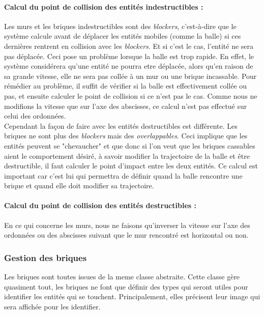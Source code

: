 \documentclass[a4paper,10pt]{article}
\begin{document}
		\paragraph{Calcul du point de collision des entités indestructibles : }
            Les murs et les briques indestructibles sont des \textit{blockers}, c'est-à-dire que le système calcule avant de
            déplacer les entités mobiles (comme la balle) si ces dernières rentrent en collision avec les \textit{blockers}.
            Et si c'est le cas, l'entité ne sera pas déplacée. Ceci pose un problème lorsque la balle est trop rapide. En
            effet, le système considérera qu'une entité ne pourra etre déplacée, alors qu'en raison de sa grande vitesse,
            elle ne sera pas collée à un mur ou une brique incassable. Pour rémédier au problème, il suffit de vérifier si
            la balle est effectivement collée ou pas, et ensuite calculer le point de collision si ce n'est pas le cas.
            Comme nous ne modifions la vitesse que sur l'axe des abscisses, ce calcul n'est pas effectué sur celui des
            ordonnées.\\

		Cependant la façon de faire avec les entités destructibles est différente. Les briques ne sont plus des \textit{blockers}
		mais des \textit{overlappables}. Ceci implique que les entités peuvent se "chevaucher" et que donc si l'on veut que les
		briques cassables aient le comportement désiré, à savoir modifier la trajectoire de la balle et être destructible, il faut
		calculer le point d'impact entre les deux entités. Ce calcul est important car c'est lui qui permettra de définir
		quand la balle rencontre une brique et quand elle doit modifier sa trajectoire.
		
		\paragraph{Calcul du point de collision des entités destructibles : }

        En ce qui concerne les murs, nous ne faisons qu'inverser la vitesse sur l'axe des ordonnées ou des abscisses suivant
        que le mur rencontré est horizontal ou non.

        

    \subsubsection{Gestion des briques}
        Les briques sont toutes issues de la meme classe abstraite. Cette classe gère quasiment tout, les briques ne font
        que définir des types qui seront utiles pour identifier les entités qui se touchent. Principalement, elles
        précisent leur image qui sera affichée pour les identifier. \\
\end{document}
